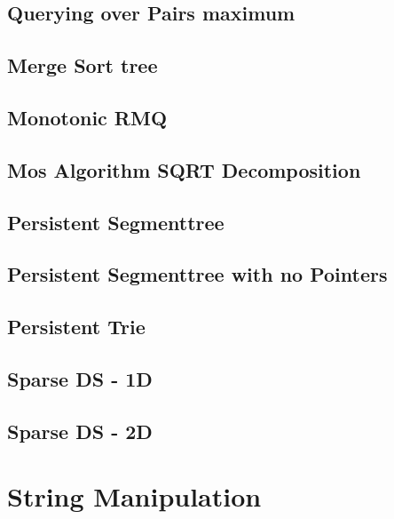 \subsection{Querying over Pairs maximum}
\raggedbottom
\hrulefill
\subsection{Merge Sort tree}
\raggedbottom
\hrulefill
\subsection{Monotonic RMQ}
\raggedbottom
\hrulefill
\subsection{Mos Algorithm SQRT Decomposition}
\raggedbottom
\hrulefill
\subsection{Persistent Segmenttree}
\raggedbottom
\hrulefill
\subsection{Persistent Segmenttree with no Pointers}
\raggedbottom
\hrulefill
\subsection{Persistent Trie}
\raggedbottom
\hrulefill
\subsection{Sparse DS - 1D}
\raggedbottom
\hrulefill
\subsection{Sparse DS - 2D}
\raggedbottom
\hrulefill

\section{String Manipulation}
